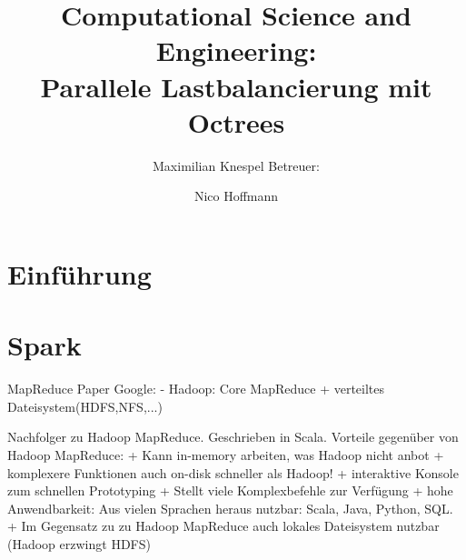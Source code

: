 \title{Computational Science and Engineering:\\Parallele Lastbalancierung mit Octrees}
\author {
	Maximilian Knespel
	\newline	\newline
	Betreuer: \and Nico Hoffmann
}
\date{}




\begin{frame}
	\titlepage
\end{frame}



\section{Einführung}



\section{Spark}


\begin{frame}
MapReduce Paper Google:
 -
Hadoop: Core MapReduce + verteiltes Dateisystem(HDFS,NFS,...)

Nachfolger zu Hadoop MapReduce. Geschrieben in Scala.
Vorteile gegenüber von Hadoop MapReduce:
  + Kann in-memory arbeiten, was Hadoop nicht anbot
  + komplexere Funktionen auch on-disk schneller als Hadoop!
  + interaktive Konsole zum schnellen Prototyping
  + Stellt viele Komplexbefehle zur Verfügung
  + hohe Anwendbarkeit: Aus vielen Sprachen heraus nutzbar: Scala, Java, Python, SQL.
  + Im Gegensatz zu zu Hadoop MapReduce auch lokales Dateisystem nutzbar (Hadoop erzwingt HDFS)
\end{frame}


